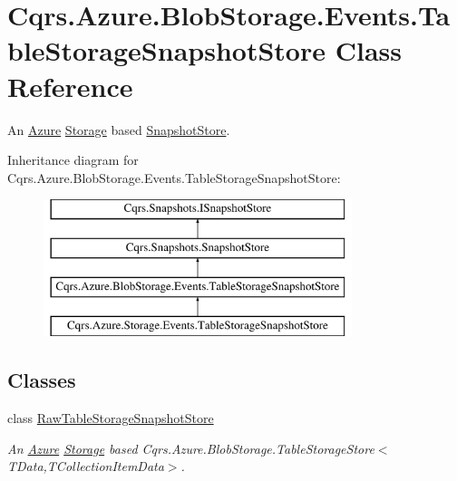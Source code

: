 \hypertarget{classCqrs_1_1Azure_1_1BlobStorage_1_1Events_1_1TableStorageSnapshotStore}{}\section{Cqrs.\+Azure.\+Blob\+Storage.\+Events.\+Table\+Storage\+Snapshot\+Store Class Reference}
\label{classCqrs_1_1Azure_1_1BlobStorage_1_1Events_1_1TableStorageSnapshotStore}


An \hyperlink{namespaceCqrs_1_1Azure}{Azure} \hyperlink{namespaceCqrs_1_1Azure_1_1Storage}{Storage} based \hyperlink{classCqrs_1_1Snapshots_1_1SnapshotStore_aa8ab186f864443c7d9647a4522864a84_aa8ab186f864443c7d9647a4522864a84}{Snapshot\+Store}.  


Inheritance diagram for Cqrs.\+Azure.\+Blob\+Storage.\+Events.\+Table\+Storage\+Snapshot\+Store\+:\begin{figure}[H]
\begin{center}
\leavevmode
\includegraphics[height=4.000000cm]{classCqrs_1_1Azure_1_1BlobStorage_1_1Events_1_1TableStorageSnapshotStore}
\end{center}
\end{figure}
\subsection*{Classes}
\begin{DoxyCompactItemize}
\item 
class \hyperlink{classCqrs_1_1Azure_1_1BlobStorage_1_1Events_1_1TableStorageSnapshotStore_1_1RawTableStorageSnapshotStore}{Raw\+Table\+Storage\+Snapshot\+Store}
\begin{DoxyCompactList}\small\item\em An \hyperlink{namespaceCqrs_1_1Azure}{Azure} \hyperlink{namespaceCqrs_1_1Azure_1_1Storage}{Storage} based Cqrs.\+Azure.\+Blob\+Storage.\+Table\+Storage\+Store$<$\+T\+Data,\+T\+Collection\+Item\+Data$>$. \end{DoxyCompactList}\end{DoxyCompactItemize}
